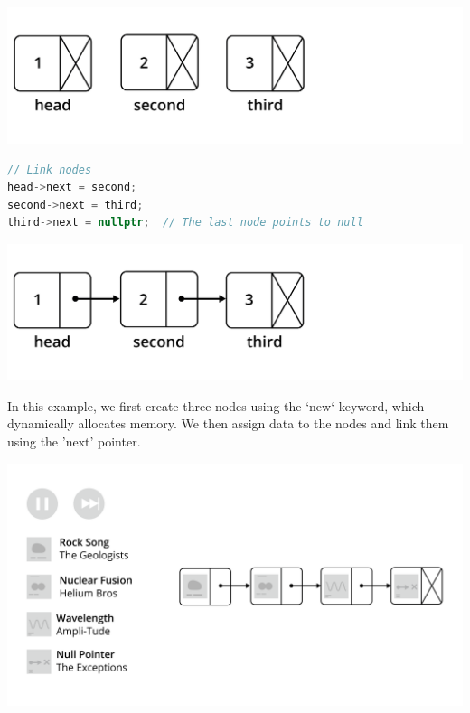 \includegraphics[width=.75\textwidth]{llexample-04.png}

\begin{lstlisting}[language=C++]
// Link nodes
head->next = second;
second->next = third;
third->next = nullptr;  // The last node points to null
\end{lstlisting}


\includegraphics[width=.75\textwidth]{llexample-05.png}



In this example, we first create three nodes using the `new` keyword,
which dynamically allocates memory. We then assign data to the nodes
and link them using the 'next' pointer.

\includegraphics[width=1\textwidth]{playlistCombined.png}
